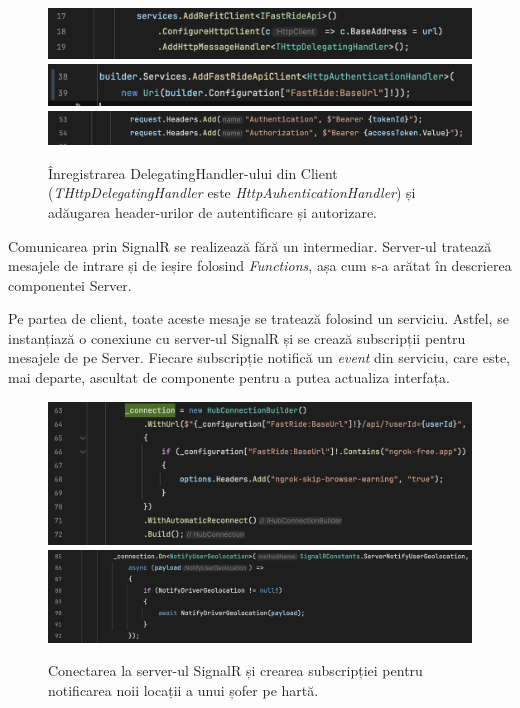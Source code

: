 \begin{figure}[H]
    \centering
    \includegraphics[width=15cm]{Assets/configureDelegate1.png}
    \includegraphics[width=15cm]{Assets/configureDelegate2.png}
    \includegraphics[width=16cm]{Assets/configureDelegate3.png}
    \caption{Înregistrarea DelegatingHandler-ului din Client (\textit{THttpDelegatingHandler} este \textit{HttpAuhenticationHandler})
        și adăugarea header-urilor de autentificare și autorizare.}
    \label{fig:configureDelegate}
\end{figure}

Comunicarea prin SignalR se realizează fără un intermediar. Server-ul tratează mesajele de intrare și de ieșire folosind
\textit{Functions}, așa cum s-a arătat în descrierea componentei Server.

Pe partea de client, toate aceste mesaje se tratează folosind un serviciu. Astfel, se instanțiază
o conexiune cu server-ul SignalR și se crează subscripții pentru mesajele de pe Server.
Fiecare subscripție notifică un \textit{event} din serviciu, care este, mai departe, ascultat de componente pentru
a putea actualiza interfața.

\begin{figure}[H]
    \centering
    \includegraphics[width=16cm]{Assets/signalrConnect.png}
    \includegraphics[width=16cm]{Assets/signalROn.png}
    \caption{Conectarea la server-ul SignalR și crearea subscripției pentru notificarea noii locații a unui șofer pe hartă.}
    \label{fig:signalR}
\end{figure}

